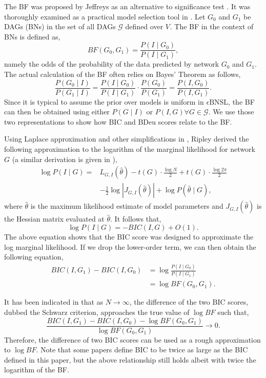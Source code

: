 \documentclass[letterpaper]{article}
\newcommand{\graph}{\mathit{G}}
\newcommand{\graphset}{\mathcal{G}}
\newcommand{\vertex}[1]{V_{#1}}
\newcommand{\problem}{\mathit{\epsilon}\text{BNSL}}
\newcommand{\varI}{I}
\begin{document}
The BF was proposed by Jeffreys as an alternative to significance test \cite{jeffreys1967theory}. It was thoroughly examined as a practical model selection tool in \cite{kass1995bayes}. Let $\graph_0$ and $\graph_1$ be DAGs (BNs) in the set of all DAGs $\graphset$ defined over $\vertex{}$. The BF in the context of BNs is defined as,
$$
BF(\graph_0,\graph_1)=\frac{P(\varI \mid \graph_0)}{P(\varI \mid \graph_1)},
$$
namely the odds of the probability of the data predicted by network $\graph_0$ and $\graph_1$. The actual calculation of the BF often relies on  Bayes' Theorem as follows,
$$
\frac{P(\graph_0 \mid \varI)}{P(\graph_1 \mid \varI)}=\frac{P(\varI \mid \graph_0)}{P(\varI \mid \graph_1)}\cdot\frac{P(\graph_0)}{P(\graph_1)}=\frac{P(\varI,\graph_0)}{P(\varI,\graph_1)}.
$$
Since it is typical to assume the prior over models is uniform in $\problem$, the BF can then be obtained using either $P(\graph \mid \varI)$ or $P(\varI,\graph)\forall\graph\in\graphset$. We use those two representations to show how BIC and BDeu scores relate to the BF.

Using Laplace approximation and other simplifications in \cite{ripley1996pattern}, Ripley derived the following approximation to the logarithm of the marginal likelihood for network $\graph$ (a similar derivation is given in \cite{Claeskens2008}),
\begin{align*}
\log{P(\varI \mid \graph)} =& L_{G,I} (\hat{\theta}) - t({G})\cdot \frac{\log N}{2}+t({G}) \cdot \frac{\log{2\pi}}{2}\\
&-\frac{1}{2}\log{|J_{G,I} (\hat{\theta})|} + \log{P(\hat{\theta} \mid \graph)},
\end{align*}
where $\hat{\theta}$ is the maximum likelihood estimate of model parameters and $J_{G,I} (\hat{\theta})$ is the Hessian matrix evaluated at $\hat{\theta}$. It follows that,
$$
\log{P(\varI \mid \graph)}=-BIC(\varI,\graph)+O(1).
$$
The above equation shows that the BIC score was designed to approximate the log marginal likelihood.
If we drop the lower-order term, we can then obtain the following equation,
\begin{align*}
BIC(\varI,\graph_1)-BIC(\varI,\graph_0)&=\log{\frac{P(\varI \mid \graph_0)}{P(\varI \mid \graph_1)}}\\
&=\log{BF(\graph_0,\graph_1)}.
\end{align*}

It has been indicated in \cite{kass1995bayes} that as $N\rightarrow\infty$, the difference of the two BIC scores,
dubbed the Schwarz criterion,  approaches the true value of $\log{BF}$ such that,
$$
\frac{BIC(\varI,\graph_1)-BIC(\varI,\graph_0)-\log{BF(\graph_0,\graph_1)}}{\log{BF(\graph_0,\graph_1)}}\rightarrow 0.
$$
Therefore, the difference of two BIC scores can be used as a rough approximation to $\log{BF}$. Note that some papers define BIC to be twice as large as the BIC defined in this paper, but the above relationship still holds albeit with twice the logarithm of the BF.
\end{document}
